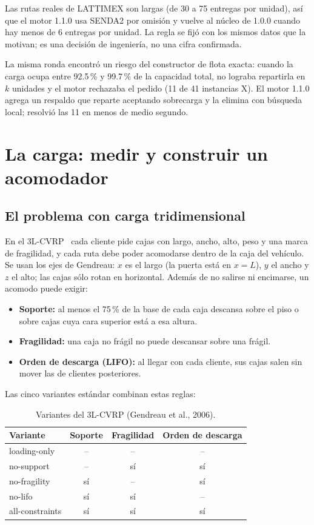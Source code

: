 \documentclass[11pt,a4paper]{article}
\newcommand{\sendados}{SENDA2}
\begin{document}
Las rutas reales de LATTIMEX son largas (de 30 a 75 entregas por unidad), así que el motor 1.1.0 usa
\sendados{} por omisión y vuelve al núcleo de 1.0.0 cuando hay menos de 6 entregas por unidad. La
regla se fijó con los mismos datos que la motivan; es una decisión de ingeniería, no una cifra
confirmada.

La misma ronda encontró un riesgo del constructor de flota exacta: cuando la carga ocupa entre 92.5\,\%
y 99.7\,\% de la capacidad total, no lograba repartirla en $k$ unidades y el motor rechazaba el pedido
(11 de 41 instancias X). El motor 1.1.0 agrega un respaldo que reparte aceptando sobrecarga y la
elimina con búsqueda local; resolvió las 11 en menos de medio segundo.

\section{La carga: medir y construir un acomodador}
\label{sec:carga}

\subsection{El problema con carga tridimensional}

En el 3L-CVRP~\cite{gendreau2006} cada cliente pide cajas con largo, ancho, alto, peso y una marca de
fragilidad, y cada ruta debe poder acomodarse dentro de la caja del vehículo. Se usan los ejes de
Gendreau: $x$ es el largo (la puerta está en $x=L$), $y$ el ancho y $z$ el alto; las cajas sólo rotan
en horizontal. Además de no salirse ni encimarse, un acomodo puede exigir:

\begin{itemize}[leftmargin=1.5em]
\item \textbf{Soporte:} al menos el 75\,\% de la base de cada caja descansa sobre el piso o sobre
cajas cuya cara superior está a esa altura.
\item \textbf{Fragilidad:} una caja no frágil no puede descansar sobre una frágil.
\item \textbf{Orden de descarga (LIFO):} al llegar con cada cliente, sus cajas salen sin mover las de
clientes posteriores.
\end{itemize}

Las cinco variantes estándar combinan estas reglas:

\begin{table}[H]
\centering
\caption{Variantes del 3L-CVRP (Gendreau et al., 2006).}
\label{tab:variantes}
\begin{tabular}{lccc}
\toprule
Variante & Soporte & Fragilidad & Orden de descarga \\
\midrule
loading-only & -- & -- & -- \\
no-support & -- & sí & sí \\
no-fragility & sí & -- & sí \\
no-lifo & sí & sí & -- \\
all-constraints & sí & sí & sí \\
\bottomrule
\end{tabular}
\end{table}
\end{document}
